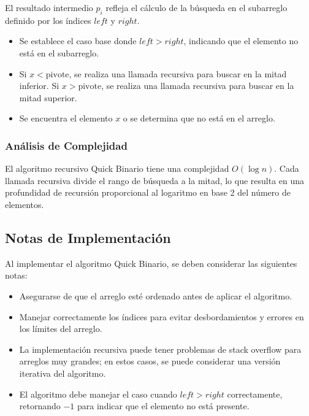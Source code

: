 \documentclass[twoside,spanish]{elsarticle}
\begin{document}
El resultado intermedio $p_{i}$ refleja el cálculo de la búsqueda en el subarreglo definido por los índices $left$ y $right$.

\begin{itemize}
    \item Se establece el caso base donde $left > right$, indicando que el elemento no está en el subarreglo.
    \item Si $x < \text{pivote}$, se realiza una llamada recursiva para buscar en la mitad inferior. Si $x > \text{pivote}$, se realiza una llamada recursiva para buscar en la mitad superior.
    \item Se encuentra el elemento $x$ o se determina que no está en el arreglo.
\end{itemize}


\subsubsection{Análisis de Complejidad}

El algoritmo recursivo Quick Binario tiene una complejidad $O(\log n)$. Cada llamada recursiva divide el rango de búsqueda a la mitad, lo que resulta en una profundidad de recursión proporcional al logaritmo en base 2 del número de elementos.

\subsection{Notas de Implementación}

Al implementar el algoritmo Quick Binario, se deben considerar las siguientes notas:
\begin{itemize}
    \item Asegurarse de que el arreglo esté ordenado antes de aplicar el algoritmo.
    \item Manejar correctamente los índices para evitar desbordamientos y errores en los límites del arreglo.
    \item La implementación recursiva puede tener problemas de stack overflow para arreglos muy grandes; en estos casos, se puede considerar una versión iterativa del algoritmo.
    \item El algoritmo debe manejar el caso cuando $left > right$ correctamente, retornando $-1$ para indicar que el elemento no está presente.
\end{itemize}
\end{document}
